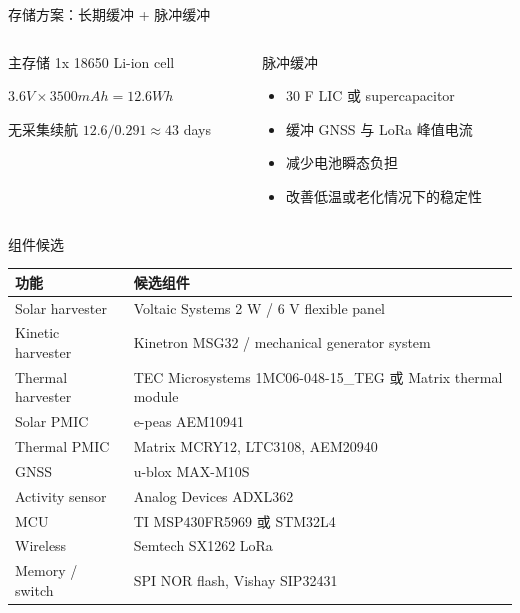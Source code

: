 \documentclass[aspectratio=169,11pt]{ctexbeamer}
\begin{document}
\begin{frame}{存储方案：长期缓冲 + 脉冲缓冲}
  \begin{columns}[T,onlytextwidth]
    \begin{column}{0.50\textwidth}
      \begin{block}{主存储}
        \centering
        1x 18650 Li-ion cell

        \vspace{0.4em}
        \Large $3.6V \times 3500mAh = 12.6Wh$
      \end{block}
      \begin{block}{无采集续航}
        \centering
        \Large $12.6 / 0.291 \approx 43$ days
      \end{block}
    \end{column}
    \begin{column}{0.46\textwidth}
      \begin{block}{脉冲缓冲}
        \begin{itemize}
          \item 30 F LIC 或 supercapacitor
          \item 缓冲 GNSS 与 LoRa 峰值电流
          \item 减少电池瞬态负担
          \item 改善低温或老化情况下的稳定性
        \end{itemize}
      \end{block}
    \end{column}
  \end{columns}
\end{frame}

\begin{frame}{组件候选}
  \small
  \begin{tabularx}{\textwidth}{@{}lY@{}}
    \toprule
    功能 & 候选组件 \\
    \midrule
    Solar harvester & Voltaic Systems 2 W / 6 V flexible panel \\
    Kinetic harvester & Kinetron MSG32 / mechanical generator system \\
    Thermal harvester & TEC Microsystems 1MC06-048-15\_TEG 或 Matrix thermal module \\
    Solar PMIC & e-peas AEM10941 \\
    Thermal PMIC & Matrix MCRY12, LTC3108, AEM20940 \\
    GNSS & u-blox MAX-M10S \\
    Activity sensor & Analog Devices ADXL362 \\
    MCU & TI MSP430FR5969 或 STM32L4 \\
    Wireless & Semtech SX1262 LoRa \\
    Memory / switch & SPI NOR flash, Vishay SIP32431 \\
    \bottomrule
  \end{tabularx}
\end{frame}
\end{document}
